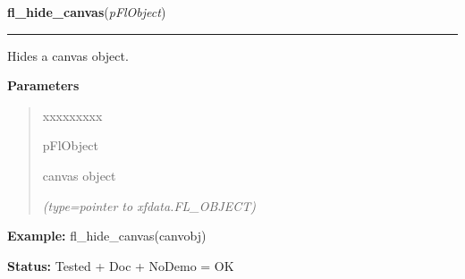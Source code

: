 \hspace{.8\funcindent}\begin{boxedminipage}{\funcwidth}

    \raggedright \textbf{fl\_hide\_canvas}(\textit{pFlObject})

    \vspace{-1.5ex}

    \rule{\textwidth}{0.5\fboxrule}
\setlength{\parskip}{2ex}
    Hides a canvas object.

\setlength{\parskip}{1ex}
      \textbf{Parameters}
      \vspace{-1ex}

      \begin{quote}
        \begin{Ventry}{xxxxxxxxx}

          \item[pFlObject]

          canvas object

            {\it (type=pointer to xfdata.FL\_OBJECT)}

        \end{Ventry}

      \end{quote}

\textbf{Example:} fl\_hide\_canvas(canvobj)



\textbf{Status:} Tested + Doc + NoDemo = OK



    \end{boxedminipage}

    \label{xformslib:flcanvas:fl_share_canvas_colormap}

    \vspace{0.5ex}

